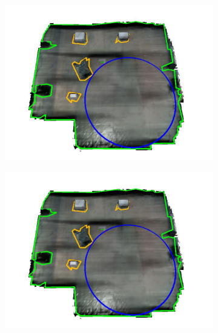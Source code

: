 \begin{figure}[!htb]
  \centering
  \begin{subfigure}[t]{.30\linewidth}
    \centering  \includegraphics[page=1,clip,trim=2cm 0cm 2cm 0cm,width=.99\linewidth]{chapter_7_experiments/imgs/mesh_man_all.pdf}
    \caption{\label{fig:ch7_mesh_a}}
  \end{subfigure}
  \begin{subfigure}[t]{.30\linewidth}
    \centering  \includegraphics[page=2,clip,trim=2cm 0cm 2cm 0cm,width=.99\linewidth]{chapter_7_experiments/imgs/mesh_man_all.pdf}
    \caption{\label{fig:ch7_mesh_b}}
  \end{subfigure}


\end{figure}
